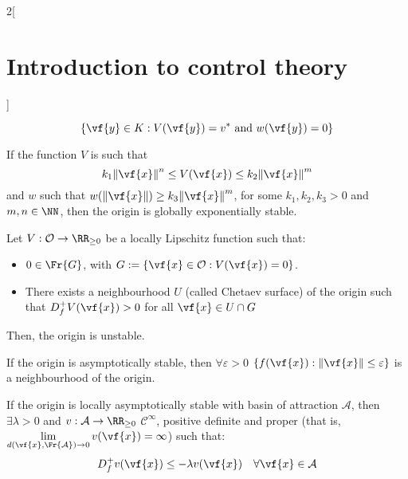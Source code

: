\documentclass[../../../main_math.tex]{subfiles}
\begin{document}
\begin{multicols}{2}[\section{Introduction to control theory}]
\begin{theorem}
    $$
      \{\vf{y}\in K: V(\vf{y})=v^*\text{ and }w(\vf{y})=0\}
    $$
  \end{theorem}
  \begin{remark}
    If the function $V$ is such that $$
      k_1\norm{\vf{x}}^n \leq V(\vf{x}) \leq k_2\norm{\vf{x}}^m
    $$
    and $w$ such that $w(\norm{\vf{x}})\geq k_3\norm{\vf{x}}^m$, for some $k_1,k_2,k_3>0$ and $m,n\in\NN$, then the origin is globally exponentially stable.
  \end{remark}
  \begin{theorem}
    Let $V:\mathcal{O}\to \RR_{\geq 0}$ be a locally Lipschitz function such that:
    \begin{itemize}
      \item $0\in \Fr{G}$, with $G:=\{\vf{x}\in \mathcal{O}: V(\vf{x})=0\}$.
      \item There exists a neighbourhood $U$ (called Chetaev surface) of the origin such that $D_f^+V(\vf{x})>0$ for all $\vf{x}\in U\cap G$
    \end{itemize}
    Then, the origin is unstable.
  \end{theorem}
  \begin{theorem}
    If the origin is asymptotically stable, then $\forall\varepsilon>0$ $\{f(\vf{x}): \norm{\vf{x}}\leq \varepsilon\}$ is a neighbourhood of the origin.
  \end{theorem}
  \begin{theorem}
    If the origin is locally asymptotically stable with basin of attraction $\mathcal{A}$, then $\exists \lambda>0$ and $v:\mathcal{A}\to \RR_{\geq 0}$ $\mathcal{C}^\infty$, positive definite and proper (that is, $\displaystyle \lim_{d(\vf{x}, \Fr{\mathcal{A}})\to 0}v(\vf{x})=\infty$) such that:
    $$
      D_f^+v(\vf{x})\leq -\lambda v(\vf{x})\quad\forall \vf{x}\in \mathcal{A}
    $$
  \end{theorem}

\end{multicols}
\end{document}
